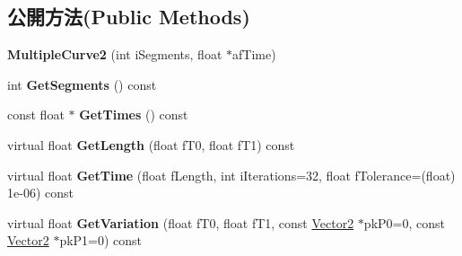 \subsection*{公開方法(Public Methods)}
\begin{DoxyCompactItemize}
\item 
{\bfseries Multiple\+Curve2} (int i\+Segments, float $\ast$af\+Time)\hypertarget{class_magnum_1_1_multiple_curve2_acdacf534482ed2412a26820a03584b41}{}\label{class_magnum_1_1_multiple_curve2_acdacf534482ed2412a26820a03584b41}

\item 
int {\bfseries Get\+Segments} () const \hypertarget{class_magnum_1_1_multiple_curve2_a68aad02ed1e733b08791f28d409ca894}{}\label{class_magnum_1_1_multiple_curve2_a68aad02ed1e733b08791f28d409ca894}

\item 
const float $\ast$ {\bfseries Get\+Times} () const \hypertarget{class_magnum_1_1_multiple_curve2_ac60cf668dad795c9e76c53a7258da82e}{}\label{class_magnum_1_1_multiple_curve2_ac60cf668dad795c9e76c53a7258da82e}

\item 
virtual float {\bfseries Get\+Length} (float f\+T0, float f\+T1) const \hypertarget{class_magnum_1_1_multiple_curve2_aa1127de832ce5d7d4607d77ed18de79b}{}\label{class_magnum_1_1_multiple_curve2_aa1127de832ce5d7d4607d77ed18de79b}

\item 
virtual float {\bfseries Get\+Time} (float f\+Length, int i\+Iterations=32, float f\+Tolerance=(float) 1e-\/06) const \hypertarget{class_magnum_1_1_multiple_curve2_a42a8976c51b638b9d5308a7d94cda171}{}\label{class_magnum_1_1_multiple_curve2_a42a8976c51b638b9d5308a7d94cda171}

\item 
virtual float {\bfseries Get\+Variation} (float f\+T0, float f\+T1, const \hyperlink{class_magnum_1_1_vector2}{Vector2} $\ast$pk\+P0=0, const \hyperlink{class_magnum_1_1_vector2}{Vector2} $\ast$pk\+P1=0) const \hypertarget{class_magnum_1_1_multiple_curve2_a1b28ea6af6c489487d74df26a35fb9b0}{}\label{class_magnum_1_1_multiple_curve2_a1b28ea6af6c489487d74df26a35fb9b0}

\end{DoxyCompactItemize}
